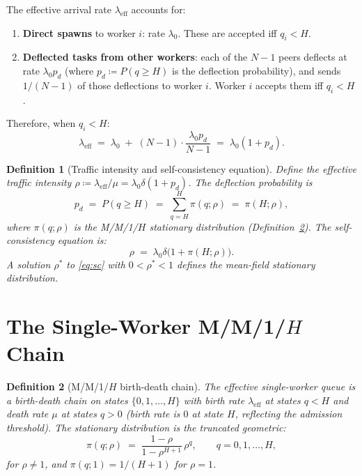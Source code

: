 \documentclass[11pt,a4paper]{article}
\newtheorem{definition}{Definition}[section]
\begin{document}
The effective arrival rate $\lambda_{\text{eff}}$ accounts for:
\begin{enumerate}
  \item \textbf{Direct spawns} to worker $i$: rate $\lambda_0$.
        These are accepted iff $q_i < H$.
  \item \textbf{Deflected tasks from other workers}: each of the
        $N-1$ peers deflects at rate $\lambda_0 p_d$ (where
        $p_d \coloneqq P(q \geq H)$ is the deflection
        probability), and sends $1/(N-1)$ of those deflections
        to worker $i$.  Worker $i$ accepts them iff $q_i < H$.
\end{enumerate}
Therefore, when $q_i < H$:
\[
  \lambda_{\text{eff}}
  \;=\; \lambda_0 \;+\; (N-1)\cdot\frac{\lambda_0 p_d}{N-1}
  \;=\; \lambda_0(1 + p_d).
\]

\begin{definition}[Traffic intensity and self-consistency equation]
\label{def:rho}
Define the \emph{effective traffic intensity}
$\rho \coloneqq \lambda_{\text{eff}} / \mu = \lambda_0 \delta (1 + p_d)$.
The deflection probability is
\[
  p_d \;=\; P(q \geq H) \;=\; \sum_{q=H}^{H} \pi(q; \rho)
  \;=\; \pi(H; \rho),
\]
where $\pi(q; \rho)$ is the M/M/1/$H$ stationary distribution
(Definition~\ref{def:mmh}).  The \emph{self-consistency equation} is:
\[
  \rho \;=\; \lambda_0\delta\bigl(1 + \pi(H;\rho)\bigr).
  \tag{SC}
  \label{eq:sc}
\]
A solution $\rho^*$ to \eqref{eq:sc} with $0 < \rho^* < 1$
defines the mean-field stationary distribution.
\end{definition}

\section{The Single-Worker M/M/1/$H$ Chain}

\begin{definition}[M/M/1/$H$ birth-death chain]
\label{def:mmh}
The \emph{effective single-worker queue} is a birth-death chain
on states $\{0, 1, \ldots, H\}$ with birth rate $\lambda_{\text{eff}}$
at states $q < H$ and death rate $\mu$ at states $q > 0$
(birth rate is $0$ at state $H$, reflecting the admission threshold).
The stationary distribution is the truncated geometric:
\[
  \pi(q;\rho) \;=\; \frac{1-\rho}{1-\rho^{H+1}}\,\rho^q,
  \qquad q = 0, 1, \ldots, H,
\]
for $\rho \neq 1$, and $\pi(q;1) = 1/(H+1)$ for $\rho = 1$.
\end{definition}
\end{document}
